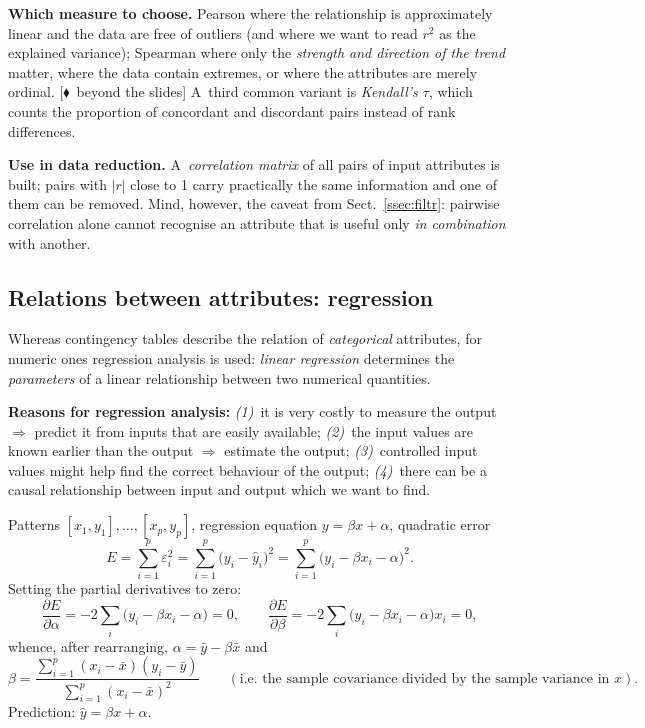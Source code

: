 \documentclass[11pt,a4paper]{article}
\theoremstyle{definition}
\newcommand{\mimo}{\textcolor{markcol}{\textsf{\footnotesize[$\blacklozenge$~beyond the slides]}}}
\begin{document}
\textbf{Which measure to choose.} Pearson where the relationship is approximately linear and the
data are free of outliers (and where we want to read $r^2$ as the explained variance); Spearman
where only the \emph{strength and direction of the trend} matter, where the data contain
extremes, or where the attributes are merely ordinal. \mimo{} A~third common variant is
\emph{Kendall's $\tau$}, which counts the proportion of concordant and discordant pairs instead
of rank differences.

\textbf{Use in data reduction.} A~\emph{correlation matrix} of all pairs of input attributes is
built; pairs with $|r|$ close to 1 carry practically the same information and one of them can be
removed. Mind, however, the caveat from Sect.~\ref{ssec:filtr}: pairwise correlation alone cannot
recognise an attribute that is useful only \emph{in combination} with another.

\subsection{Relations between attributes: regression}
\label{ssec:regrese}

Whereas contingency tables describe the relation of \emph{categorical} attributes, for numeric
ones regression analysis is used: \emph{linear regression} determines the \emph{parameters} of
a linear relationship between two numerical quantities.

\textbf{Reasons for regression analysis:} \emph{(1)}~it is very costly to measure the output
$\Rightarrow$ predict it from inputs that are easily available; \emph{(2)}~the input values are
known earlier than the output $\Rightarrow$ estimate the output; \emph{(3)}~controlled input
values might help find the correct behaviour of the output; \emph{(4)}~there can be a causal
relationship between input and output which we want to find.

\begin{defbox}
Patterns $[x_1,y_1],\dots,[x_p,y_p]$, regression equation $y=\beta x+\alpha$, quadratic error
\[ E=\sum_{i=1}^{p}\varepsilon_i^2=\sum_{i=1}^{p}\big(y_i-\hat y_i\big)^2
   =\sum_{i=1}^{p}\big(y_i-\beta x_i-\alpha\big)^2. \]
Setting the partial derivatives to zero:
\[ \frac{\partial E}{\partial\alpha}=-2\sum_i\big(y_i-\beta x_i-\alpha\big)=0,\qquad
   \frac{\partial E}{\partial\beta}=-2\sum_i\big(y_i-\beta x_i-\alpha\big)x_i=0, \]
whence, after rearranging, $\alpha=\bar y-\beta\bar x$ and
\[ \beta=\frac{\sum_{i=1}^{p}(x_i-\bar x)(y_i-\bar y)}{\sum_{i=1}^{p}(x_i-\bar x)^2}
   \qquad(\text{i.e.\ the sample covariance divided by the sample variance in }x). \]
Prediction: $\hat y=\beta x+\alpha$.
\end{defbox}
\end{document}

